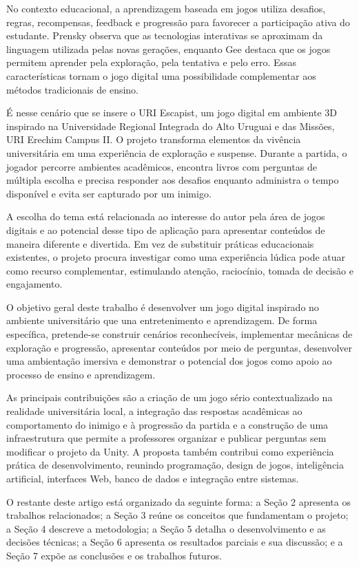 \documentclass[12pt]{article}
\begin{document}
No contexto educacional, a aprendizagem baseada em jogos utiliza desafios, regras, recompensas, feedback e progressão para favorecer a participação ativa do estudante. Prensky \cite{prensky2001} observa que as tecnologias interativas se aproximam da linguagem utilizada pelas novas gerações, enquanto Gee \cite{gee2003} destaca que os jogos permitem aprender pela exploração, pela tentativa e pelo erro. Essas características tornam o jogo digital uma possibilidade complementar aos métodos tradicionais de ensino.

É nesse cenário que se insere o URI Escapist, um jogo digital em ambiente 3D inspirado na Universidade Regional Integrada do Alto Uruguai e das Missões, URI Erechim Campus II. O projeto transforma elementos da vivência universitária em uma experiência de exploração e suspense. Durante a partida, o jogador percorre ambientes acadêmicos, encontra livros com perguntas de múltipla escolha e precisa responder aos desafios enquanto administra o tempo disponível e evita ser capturado por um inimigo.

A escolha do tema está relacionada ao interesse do autor pela área de jogos digitais e ao potencial desse tipo de aplicação para apresentar conteúdos de maneira diferente e divertida. Em vez de substituir práticas educacionais existentes, o projeto procura investigar como uma experiência lúdica pode atuar como recurso complementar, estimulando atenção, raciocínio, tomada de decisão e engajamento.

O objetivo geral deste trabalho é desenvolver um jogo digital inspirado no ambiente universitário que una entretenimento e aprendizagem. De forma específica, pretende-se construir cenários reconhecíveis, implementar mecânicas de exploração e progressão, apresentar conteúdos por meio de perguntas, desenvolver uma ambientação imersiva e demonstrar o potencial dos jogos como apoio ao processo de ensino e aprendizagem.

As principais contribuições são a criação de um jogo sério contextualizado na realidade universitária local, a integração das respostas acadêmicas ao comportamento do inimigo e à progressão da partida e a construção de uma infraestrutura que permite a professores organizar e publicar perguntas sem modificar o projeto da Unity. A proposta também contribui como experiência prática de desenvolvimento, reunindo programação, design de jogos, inteligência artificial, interfaces Web, banco de dados e integração entre sistemas.

O restante deste artigo está organizado da seguinte forma: a Seção 2 apresenta os trabalhos relacionados; a Seção 3 reúne os conceitos que fundamentam o projeto; a Seção 4 descreve a metodologia; a Seção 5 detalha o desenvolvimento e as decisões técnicas; a Seção 6 apresenta os resultados parciais e sua discussão; e a Seção 7 expõe as conclusões e os trabalhos futuros.
\end{document}
